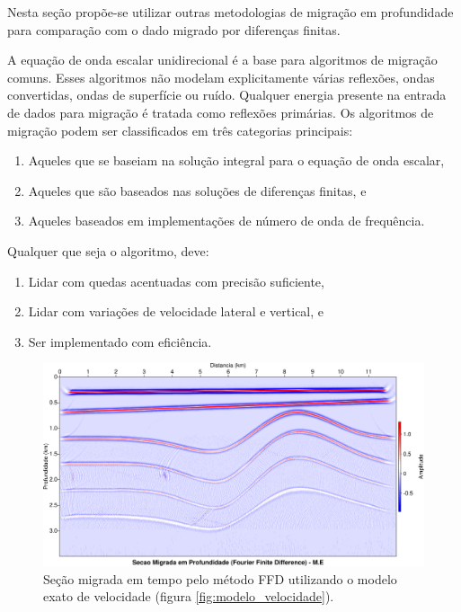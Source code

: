 Nesta seção propõe-se utilizar outras metodologias de migração em profundidade para comparação com o dado migrado por diferenças finitas.

A equação de onda escalar unidirecional é a base para algoritmos de migração comuns. Esses algoritmos não modelam explicitamente várias reflexões, ondas convertidas, ondas de superfície ou ruído. Qualquer energia presente na entrada de dados para migração é tratada como reflexões primárias. Os algoritmos de migração podem ser classificados em três categorias principais: \citep{Yilmaz(2000)}

\begin{enumerate}
 \item Aqueles que se baseiam na solução integral para o equação de onda escalar,
 \item Aqueles que são baseados nas soluções de diferenças finitas, e
 \item Aqueles baseados em implementações de número de onda de frequência.
\end{enumerate}

Qualquer que seja o algoritmo, deve:
\begin{enumerate}
 \item Lidar com quedas acentuadas com precisão suficiente,
 \item Lidar com variações de velocidade lateral e vertical, e
 \item Ser implementado com eficiência.
\end{enumerate}

\begin{landscape}
\begin{figure}[H]
\centering
\includegraphics[totalheight=14cm]{figuras/cap3/seis_Mig_FFD_depth_me.pdf}
\caption{Seção migrada em tempo pelo método FFD utilizando o modelo exato de velocidade (figura \ref{fig:modelo_velocidade}).}
\label{fig:seis_mig_depth_fd_me}
\end{figure}
\end{landscape}


